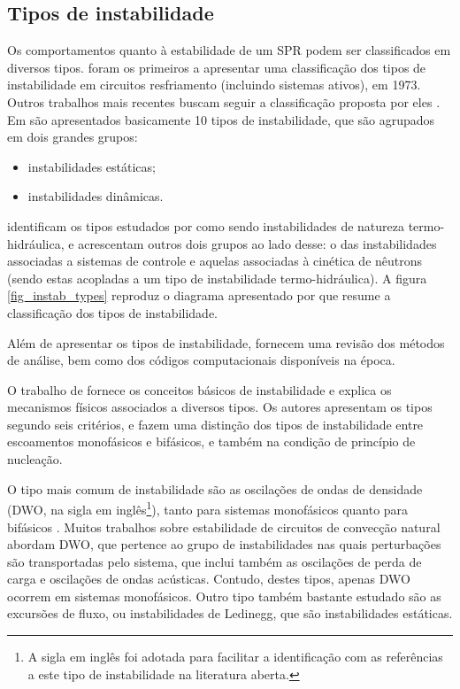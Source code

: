 \documentclass[a4paper,portuguese,10pt]{article}
\begin{document}
\subsection{Tipos de instabilidade\label{sec_tipos}}

Os comportamentos quanto à estabilidade de um SPR podem ser classificados em diversos tipos. \citet{BOURE73} foram os primeiros a apresentar uma classificação dos tipos de instabilidade em circuitos resfriamento (incluindo sistemas ativos), em 1973. Outros trabalhos mais recentes buscam seguir a classificação proposta por eles \cite{LEUBA93,VIJAYAN05b,PRASAD07}. Em \citet{BOURE73} são apresentados basicamente 10 tipos de instabilidade, que são agrupados em dois grandes grupos: 

\begin{itemize}
\item instabilidades estáticas;
\item instabilidades dinâmicas.
\end{itemize}

\citet{PRASAD07} identificam os tipos estudados por \citet{BOURE73} como sendo instabilidades de natureza termo-hidráulica, e acrescentam outros dois grupos ao lado desse: o das instabilidades associadas a sistemas de controle e aquelas associadas à cinética de nêutrons (sendo estas acopladas a um tipo de instabilidade termo-hidráulica). A figura \ref{fig_instab_types} reproduz o diagrama apresentado por \citet{PRASAD07} que resume a classificação dos tipos de instabilidade.

Além de apresentar os tipos de instabilidade, \citet{PRASAD07} fornecem uma revisão dos métodos de análise, bem como dos códigos computacionais disponíveis na época.

O trabalho de \citet{VIJAYAN05b} fornece os conceitos básicos de instabilidade e explica os mecanismos físicos associados a diversos tipos. Os autores apresentam os tipos segundo seis critérios, e fazem uma distinção dos tipos de instabilidade entre escoamentos monofásicos e bifásicos, e também na condição de princípio de nucleação.

O tipo mais comum de instabilidade são as oscilações de ondas de densidade (DWO, na sigla em inglês\footnote{A sigla em inglês foi adotada para facilitar a identificação com as referências a este tipo de instabilidade na literatura aberta.}), tanto para sistemas monofásicos quanto para bifásicos \cite{VIJAYAN05b}. Muitos trabalhos sobre estabilidade de circuitos de convecção natural abordam DWO, que pertence ao grupo de instabilidades nas quais perturbações são transportadas pelo sistema, que inclui também as oscilações de perda de carga e oscilações de ondas acústicas. Contudo, destes tipos, apenas DWO ocorrem \cite{VIJAYAN05b} em sistemas monofásicos. Outro tipo também bastante estudado são as excursões de fluxo, ou instabilidades de Ledinegg, que são instabilidades estáticas.
\end{document}
